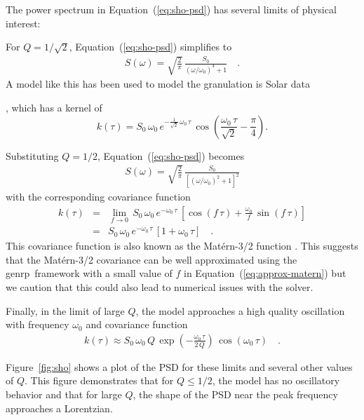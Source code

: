 \documentclass[manuscript, letterpaper]{aastex6}
\newcommand{\project}[1]{\textsf{#1}}
\newcommand{\genrp}{\project{genrp}}
\newcommand{\figureref}[1]{\ref{fig:#1}}
\newcommand{\Figure}[1]{Figure~\figureref{#1}}
\renewcommand{\eqref}[1]{\ref{eq:#1}}
\newcommand{\Eq}[1]{Equation~(\eqref{#1})}
\newcommand{\eq}[1]{\Eq{#1}}
\newcommand{\eqlabel}[1]{\label{eq:#1}}
\begin{document}
The power spectrum in \eq{sho-psd} has several limits of physical interest:
\begin{itemize}

{\item For $Q = 1/\sqrt{2}$, \eq{sho-psd} simplifies to
\begin{eqnarray}
S(\omega) = \sqrt{\frac{2}{\pi}}\,\frac{S_0}{(\omega/\omega_0)^4+1} \quad.
\end{eqnarray}
A model like this has been used to model the granulation is Solar data
\citep{Michel:2009}}, which has a kernel of
\begin{equation}
k(\tau) = S_0\,\omega_0\,e^{-\frac{1}{\sqrt{2}}\,\omega_0\,\tau}\,
    \cos{\left(\frac{\omega_0\,\tau}{\sqrt{2}}-\frac{\pi}{4}\right)}.
\end{equation}

{\item Substituting $Q = 1/2$, \eq{sho-psd} becomes
\begin{eqnarray}
S(\omega) =
    \sqrt{\frac{2}{\pi}}\,\frac{S_0}{\left[(\omega/\omega_0)^2+1\right]^2}
\end{eqnarray}
with the corresponding covariance function
\begin{eqnarray}\eqlabel{approx-matern}
k(\tau) &=& \lim_{f \to 0}\,
    S_0\,\omega_0\,e^{-\omega_0\,\tau}\,
    \left[\cos(f\,\tau) + \frac{\omega_0}{f}\,\sin(f\,\tau)\right] \\
&=& S_0\,\omega_0\,e^{-\omega_0\,\tau}\,[1+\omega_0\,\tau] \quad.
\end{eqnarray}
This covariance function is also known as the Mat\'ern-3/2 function
\citep{Rasmussen:2006}.
This suggests that the Mat\'ern-3/2 covariance can be well approximated using
the \genrp\ framework with a small value of $f$ in \eq{approx-matern} but we
caution that this could also lead to numerical issues with the solver.
}

{\item Finally, in the limit of large $Q$, the model approaches a high
    quality oscillation with frequency $\omega_0$ and covariance function
\begin{eqnarray}
k(\tau) \approx
    S_0\,\omega_0\,Q\,
    \exp\left(-\frac{\omega_0\,\tau}{2\,Q}\right)\,
    \cos\left(\omega_0\,\tau\right) \quad.
\end{eqnarray}}

\end{itemize}
\Figure{sho} shows a plot of the PSD for these limits and several other values
of $Q$.
This figure demonstrates that for $Q \le 1/2$, the model has no oscillatory
behavior and that for large $Q$, the shape of the PSD near the peak frequency
approaches a Lorentzian.
\end{document}
